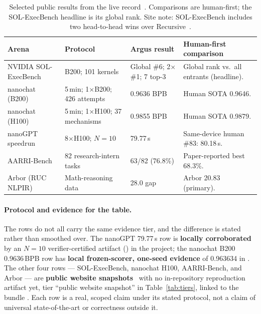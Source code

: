 \begin{table}[h]
\centering
\small
\renewcommand{\arraystretch}{1.3}
\begin{tabularx}{\linewidth}{@{}p{2.6cm} p{2.9cm} p{2.35cm} X@{}}
\toprule
\textbf{Arena} & \textbf{Protocol} & \textbf{Argus result} & \textbf{Human-first comparison} \\
\midrule
NVIDIA SOL-ExecBench & B200; 101 kernels & Global \#6; 2$\times$ \#1; 7 top-3 & Global rank vs.\ all entrants (headline). \\
nanochat (B200) & 5\,min; 1$\times$B200; 426 attempts & 0.9636 BPB & Human SOTA 0.9646. \\
nanochat (H100) & 5\,min; 1$\times$H100; 37 mechanisms & 0.9855 BPB & Human SOTA 0.9879. \\
nanoGPT speedrun & 8$\times$H100; $N{=}10$ & 79.77\,s & Same-device human \#83: 80.18\,s. \\
AARRI-Bench & 82 research-intern tasks & 63/82 (76.8\%) & Paper-reported best 68.3\%. \\
Arbor (RUC NLPIR) & Math-reasoning data & 28.0 gap & Arbor 20.83 (primary). \\
\bottomrule
\end{tabularx}
\caption{Selected public results from the live record~\cite{argus_results}.
Comparisons are human-first; the SOL-ExecBench headline is its global rank. Site
note: SOL-ExecBench includes two head-to-head wins over
Recursive~\cite{recursive2026firststeps}.}
\label{tab:results}
\end{table}

\paragraph{Protocol and evidence for the table.} The rows do not all carry the
same evidence tier, and the difference is stated rather than smoothed over. The
nanoGPT 79.77\,s row is \textbf{locally corroborated} by an $N{=}10$
verifier-certified artifact () in the
 project; the nanochat B200 0.9636\,BPB row has
\textbf{local frozen-scorer, one-seed evidence} of 0.963634 in
. The other four rows --- SOL-ExecBench, nanochat
H100, AARRI-Bench, and Arbor --- are \textbf{public website
snapshots}~\cite{argus_results} with no in-repository reproduction artifact yet,
tier ``public website snapshot'' in Table~\ref{tab:tiers}, linked to the bundle
. Each row is a real,
scoped claim under its stated protocol, not a claim of universal state-of-the-art
or correctness outside it.

